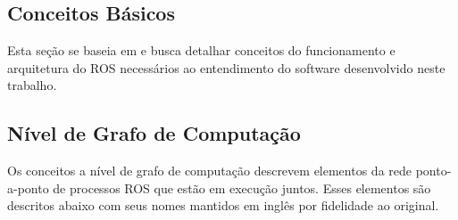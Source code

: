 \subsection{Conceitos Básicos}
Esta seção se baseia em \citep{ros_concepts} e busca detalhar conceitos do funcionamento e arquitetura do ROS necessários ao entendimento do software desenvolvido neste trabalho. 


\subsection{Nível de Grafo de Computação}
Os conceitos a nível de grafo de computação descrevem elementos da rede ponto-a-ponto de processos ROS que estão em execução juntos. Esses elementos são descritos abaixo com seus nomes mantidos em inglês por fidelidade ao original.

